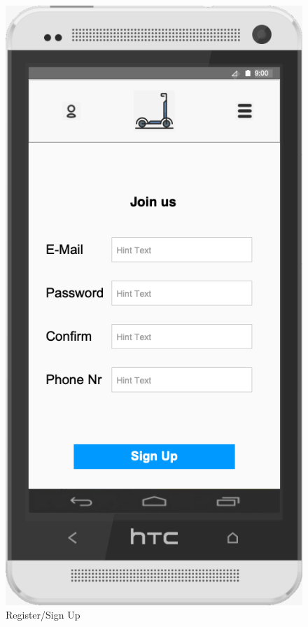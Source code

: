 \documentclass[a4paper, 12pt]{article}
\begin{document}
\begin{figure} [htbp]
  \begin{center}
    \includegraphics[scale=0.5]{images/prototypes/05-register-sign-up.png}
  \end{center}
  \caption{Register/Sign Up}
\end{figure}
\end{document}
